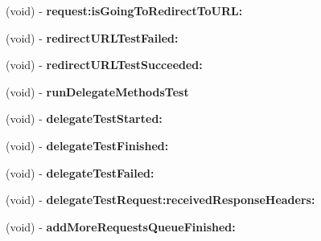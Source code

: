 \begin{DoxyCompactItemize}
\item 
\hypertarget{interface_a_s_i_network_queue_tests_07_08_a9c8b850314922591e1732a6167fab9c1}{
(void) -\/ {\bfseries request\-:is\-Going\-To\-Redirect\-To\-U\-R\-L\-:}}
\label{interface_a_s_i_network_queue_tests_07_08_a9c8b850314922591e1732a6167fab9c1}

\item 
\hypertarget{interface_a_s_i_network_queue_tests_07_08_a31a782738cbfac85a60c92e87dd07972}{
(void) -\/ {\bfseries redirect\-U\-R\-L\-Test\-Failed\-:}}
\label{interface_a_s_i_network_queue_tests_07_08_a31a782738cbfac85a60c92e87dd07972}

\item 
\hypertarget{interface_a_s_i_network_queue_tests_07_08_a02802eb48180e644ceee78ca4840607d}{
(void) -\/ {\bfseries redirect\-U\-R\-L\-Test\-Succeeded\-:}}
\label{interface_a_s_i_network_queue_tests_07_08_a02802eb48180e644ceee78ca4840607d}

\item 
\hypertarget{interface_a_s_i_network_queue_tests_07_08_aac272d1e4ebf8932ab723637f3abe58c}{
(void) -\/ {\bfseries run\-Delegate\-Methods\-Test}}
\label{interface_a_s_i_network_queue_tests_07_08_aac272d1e4ebf8932ab723637f3abe58c}

\item 
\hypertarget{interface_a_s_i_network_queue_tests_07_08_ad63bd013de90e522e12f2bba603c20d7}{
(void) -\/ {\bfseries delegate\-Test\-Started\-:}}
\label{interface_a_s_i_network_queue_tests_07_08_ad63bd013de90e522e12f2bba603c20d7}

\item 
\hypertarget{interface_a_s_i_network_queue_tests_07_08_aa05a6ec84d2a71b363573187e70a6afa}{
(void) -\/ {\bfseries delegate\-Test\-Finished\-:}}
\label{interface_a_s_i_network_queue_tests_07_08_aa05a6ec84d2a71b363573187e70a6afa}

\item 
\hypertarget{interface_a_s_i_network_queue_tests_07_08_a3b74243c00c86e888ffc9cb271138dcb}{
(void) -\/ {\bfseries delegate\-Test\-Failed\-:}}
\label{interface_a_s_i_network_queue_tests_07_08_a3b74243c00c86e888ffc9cb271138dcb}

\item 
\hypertarget{interface_a_s_i_network_queue_tests_07_08_a46a23624618c0547cbcbb9ca82c798cb}{
(void) -\/ {\bfseries delegate\-Test\-Request\-:received\-Response\-Headers\-:}}
\label{interface_a_s_i_network_queue_tests_07_08_a46a23624618c0547cbcbb9ca82c798cb}

\item 
\hypertarget{interface_a_s_i_network_queue_tests_07_08_abe54bb28f6c58b48f2e136adebe7591c}{
(void) -\/ {\bfseries add\-More\-Requests\-Queue\-Finished\-:}}
\label{interface_a_s_i_network_queue_tests_07_08_abe54bb28f6c58b48f2e136adebe7591c}


\end{DoxyCompactItemize}
